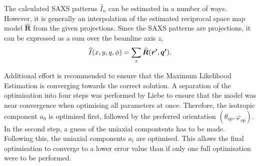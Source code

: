 The calculated SAXS patterns $\widehat{I}_{n}$ can be estimated in a number of ways.
However, it is generally an interpolation of the estimated reciprocal space map model $\bm{\widehat{R}}$ from the given projections.
Since the SAXS patterns are projections, it can be expressed as a sum over the beamline axis $z$,
\begin{equation}\label{eq:SAXS_intensity}
    \widehat{I}(x,y,q,\phi) = \sum_{z} \bm{\widehat{R}}(\bm{r'}, \bm{q'}).
\end{equation}

Additional effort is recommended to ensure that the Maximum Likelihood Estimation is converging towards the correct solution.
A separation of the optimisation into four steps was performed by Liebe \cite{liebi2018small} to ensure that the model was near convergence when optimising all parameters at once.
Therefore, the isotropic component $a_{0}$ is optimised first, followed by the preferred orientation $(\theta_{op}, \varphi_{op})$. In the second step, a guess of the uniaxial compontents has to be made.
Following this, the uniaxial components $a_{l}$ are optimised.
This allows the final optimisation to converge to a lower error value than if only one full optimisation were to be performed.


